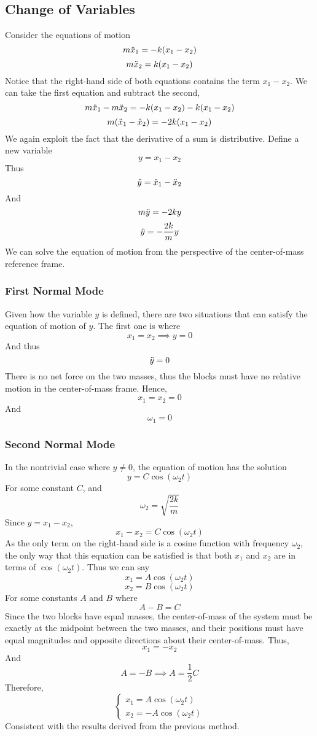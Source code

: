 \documentclass[11pt]{article}
\theoremstyle{gangnamstyle}{\newtheorem{definition}{Definition}[]}
\theoremstyle{gangnamstyle}{\newtheorem{example}{Example}[]}
\theoremstyle{gangnamstyle}{\newtheorem{problem}{Problem}[]}
\theoremstyle{gangnamstyle}{\newtheorem{warning}{Warning}[]}
\begin{document}
\subsection{Change of Variables}

Consider the equations of motion 
\[ m\Ddot{x}_1 = -k(x_1 - x_2) \]
\[ m\Ddot{x}_2 = k(x_1 - x_2) \]
Notice that the right-hand side of both equations contains the term $x_1 - x_2$. We can take the first equation and subtract the second, 
\[ m\Ddot{x}_1 - m\Ddot{x}_2 = - k(x_1 - x_2) - k(x_1 - x_2) \]
\[ m(\Ddot{x}_1 - \Ddot{x}_2) = -2k(x_1 - x_2) \]
We again exploit the fact that the derivative of a sum is distributive. Define a new variable
\[ y = x_1 - x_2 \]
Thus
\[ \Ddot{y} = \Ddot{x}_1 - \Ddot{x}_2 \]
And
\[ m\Ddot{y} = -2ky \]
\[ \Ddot{y} = -\frac{2k}{m}y \]
We can solve the equation of motion from the perspective of the center-of-mass reference frame. 

\subsubsection{First Normal Mode}

Given how the variable $y$ is defined, there are two situations that can satisfy the equation of motion of $y$. The first one is where 
\[ x_1 = x_2 \implies y = 0 \]
And thus
\[ \Ddot{y} = 0 \]
There is no net force on the two masses, thus the blocks must have no relative motion in the center-of-mass frame. Hence, 
\[ x_1 = x_2 = 0 \]
And
\[ \omega_1 = 0 \]

\subsubsection{Second Normal Mode}

In the nontrivial case where $y \neq 0$, the equation of motion has the solution
\[ y = C\cos(\omega_2 t) \]
For some constant $C$, and
\[ \omega_2 = \sqrt{\frac{2k}{m}} \]
Since $y = x_1 - x_2$, 
\[ x_1 - x_2 = C\cos(\omega_2 t) \]
As the only term on the right-hand side is a cosine function with frequency $\omega_2$, the only way that this equation can be satisfied is that both $x_1$ and $x_2$ are in terms of $\cos(\omega_2 t)$. Thus we can say
\[ x_1 = A\cos(\omega_2 t) \]
\[ x_2 = B\cos(\omega_2 t) \]
For some constants $A$ and $B$ where
\[ A - B = C \]
Since the two blocks have equal masses, the center-of-mass of the system must be exactly at the midpoint between the two masses, and their positions must have equal magnitudes and opposite directions about their center-of-mass. Thus, 
\[ x_1 = -x_2 \]
And
\[ A = -B \implies A = \frac{1}{2}C \]
Therefore, 
\[ \begin{cases}
x_1 = A\cos(\omega_2 t) \\
x_2 = - A\cos(\omega_2 t)
\end{cases} \]
Consistent with the results derived from the previous method. 
\end{document}
